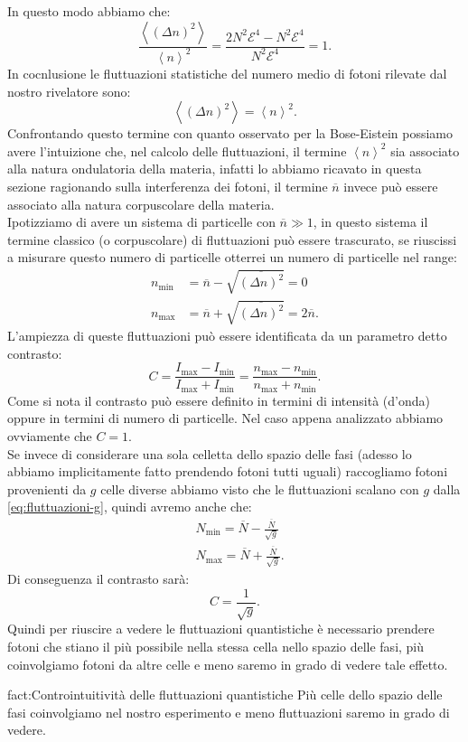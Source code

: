 In questo modo abbiamo che:
\[
	\frac{\left<\left( \Delta n \right) ^2 \right>}{\left< n \right>^2}
	=
	\frac{2N^2\mathcal{E}^4 - N^2\mathcal{E}^4}{N^2\mathcal{E}^4}
	=
	1
.\] 
In cocnlusione le fluttuazioni statistiche del numero medio di fotoni rilevate dal nostro rivelatore sono:
\[
	\left<\left( \Delta n \right)^2 \right> = \left<n \right>^2
.\] 
Confrontando questo termine con quanto osservato per la Bose-Eistein possiamo avere l'intuizione che, nel calcolo delle fluttuazioni, il termine $\left<n \right>^2$ sia associato alla natura ondulatoria della materia, infatti lo abbiamo ricavato in questa sezione ragionando sulla interferenza dei fotoni, il termine $\overline{n}$ invece può essere associato alla natura corpuscolare della materia.\\
Ipotizziamo di avere un sistema di particelle con $\overline{n}\gg 1$, in questo sistema il termine classico (o corpuscolare) di fluttuazioni può essere trascurato, se riuscissi a misurare questo numero di particelle otterrei un numero di particelle nel range:
\[\begin{aligned}
	n_\text{min} &= \overline{n}-\sqrt{\overline{\left( \Delta n \right)^2}} = 0\\
	n_\text{max} &= \overline{n}+\sqrt{\overline{\left( \Delta n \right)^2}} 
	= 2\overline{n}
.\end{aligned}\]
L'ampiezza di queste fluttuazioni può essere identificata da un parametro detto contrasto:
\[
	C = \frac{I_\text{max} - I_\text{min}}{I_\text{max} + I_\text{min}} =
	\frac{n_\text{max} - n_\text{min} }{n_\text{max} + n_\text{min} }
.\] 
Come si nota il contrasto può essere definito in termini di intensità (d'onda) oppure in termini di numero di particelle. Nel caso appena analizzato abbiamo ovviamente che $C=1$.\\
Se invece di considerare una sola celletta dello spazio delle fasi (adesso lo abbiamo implicitamente fatto prendendo fotoni tutti uguali) raccogliamo fotoni provenienti da $g$ celle diverse abbiamo visto che le fluttuazioni scalano con  $g$ dalla \ref{eq:fluttuazioni-g}, quindi avremo anche che:
\[\begin{aligned}
	&N_\text{min} = \overline{N}-\frac{\overline{N}}{\sqrt{g}}\\
	&N_\text{max} = \overline{N} + \frac{\overline{N}}{\sqrt{g}}
.\end{aligned}\]
Di conseguenza il contrasto sarà:
\[
	C = \frac{1}{\sqrt{g}}
.\] 
Quindi per riuscire a vedere le fluttuazioni quantistiche è necessario prendere fotoni che stiano il più possibile nella stessa cella nello spazio delle fasi, più coinvolgiamo fotoni da altre celle e meno saremo in grado di vedere tale effetto.
\begin{fact}{fact:Controintuitività delle fluttuazioni quantistiche}
	Più celle dello spazio delle fasi coinvolgiamo nel nostro esperimento e meno fluttuazioni saremo in grado di vedere. 
\end{fact}
